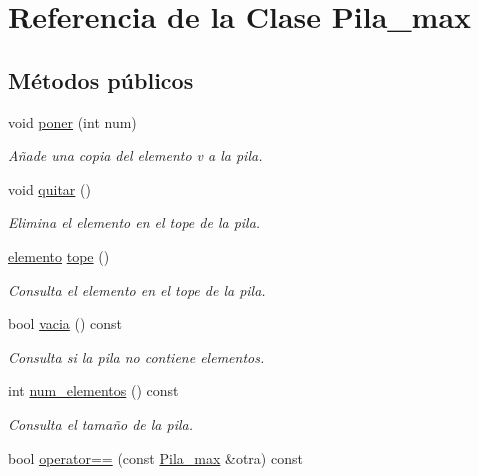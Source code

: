 \hypertarget{classPila__max}{}\section{Referencia de la Clase Pila\+\_\+max}
\label{classPila__max}
\subsection*{Métodos públicos}
\begin{DoxyCompactItemize}
\item 
void \hyperlink{classPila__max_acb56642abe72ba171668295fe04202e1}{poner} (int num)
\begin{DoxyCompactList}\small\item\em Añade una copia del elemento v a la pila. \end{DoxyCompactList}\item 
\mbox{\label{classPila__max_ac4615eccf7d95bf4433e3da16c9aa2a2}} 
void \hyperlink{classPila__max_ac4615eccf7d95bf4433e3da16c9aa2a2}{quitar} ()
\begin{DoxyCompactList}\small\item\em Elimina el elemento en el tope de la pila. \end{DoxyCompactList}\item 
\hyperlink{structelemento}{elemento} \hyperlink{classPila__max_a14209c559be8250baeb0e3366e088462}{tope} ()
\begin{DoxyCompactList}\small\item\em Consulta el elemento en el tope de la pila. \end{DoxyCompactList}\item 
bool \hyperlink{classPila__max_a4b5784d89db4908b84a4ece46bc179fb}{vacia} () const
\begin{DoxyCompactList}\small\item\em Consulta si la pila no contiene elementos. \end{DoxyCompactList}\item 
int \hyperlink{classPila__max_a693ba4373cac8db4d820ff6c76d6d8da}{num\+\_\+elementos} () const
\begin{DoxyCompactList}\small\item\em Consulta el tamaño de la pila. \end{DoxyCompactList}\item 
bool \hyperlink{classPila__max_a8806f343ed75ecf695db7a307b6f65ed}{operator==} (const \hyperlink{classPila__max}{Pila\+\_\+max} \&otra) const

\end{DoxyCompactItemize}
